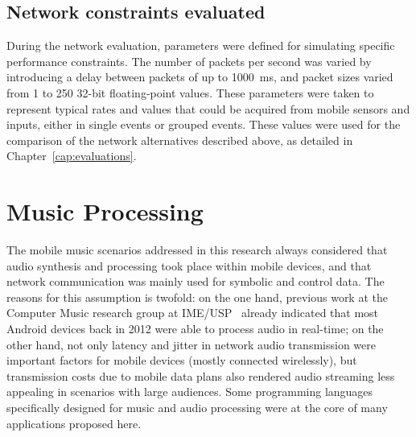 \subsection*{Network constraints evaluated}

During the network evaluation, parameters were defined for simulating specific performance constraints.
The number of packets per second was varied by introducing a delay between packets of up to 1000~ms, and packet sizes varied from 1 to 250 32-bit floating-point values. These parameters were taken to represent typical rates and values that could be acquired from mobile sensors and inputs, either in single events or grouped events.
These values were used for the comparison of the network alternatives described above, as detailed in Chapter~\ref{cap:evaluations}.


\section{Music Processing}

The mobile music scenarios addressed in this research always considered that audio synthesis and processing took place within mobile devices, and that network communication was mainly used for symbolic and control data. The reasons for this assumption is twofold: on the one hand, previous work at the Computer Music research group at IME/USP~\citep{bianchi2014processamento} already indicated that most Android devices back in 2012 were able to process audio in real-time; on the other hand, not only latency and jitter in network audio transmission were important factors for mobile devices (mostly connected wirelessly), but transmission costs due to mobile data plans also rendered audio streaming less appealing in scenarios with large audiences. Some programming languages specifically designed for music and audio processing were at the core of many applications proposed here.


